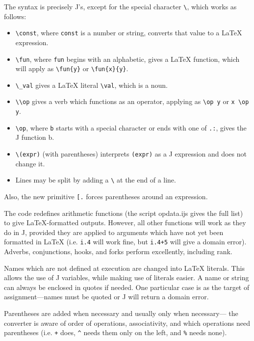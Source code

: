 \documentclass{article}
\begin{document}
The syntax is precisely J's, except for the special character
\lstinline`\`, which works as follows:
\begin{itemize}
  \item \lstinline`\const`, where \lstinline`const` is a number or string,
    converts that value to a LaTeX expression.
  \item \lstinline`\fun`, where \lstinline`fun` begins with an alphabetic,
    gives a LaTeX function, which will apply as \lstinline`\fun{y}`
    or \lstinline`\fun{x}{y}`.
  \item \lstinline`\_val` gives a LaTeX literal \lstinline`\val`, which is a noun.
  \item \lstinline`\\op` gives a verb which functions as an operator,
    applying as \lstinline`\op y` or \lstinline`x \op y`.
  \item \lstinline`\op`, where \lstinline`b` starts with a special character or
    ends with one of \lstinline`.:`, gives the J function b.
  \item \lstinline`\(expr)` (with parentheses) interprets \lstinline`(expr)`
    as a J expression and does not change it.
  \item Lines may be split by adding a \lstinline`\` at the end of a line.
\end{itemize}

Also, the new primitive \lstinline`[.` forces parentheses around an expression.

The code redefines arithmetic functions (the script opdata.ijs gives the
full list) to give LaTeX-formatted outputs.
However, all other functions will work as they do in J, provided they are
applied to arguments which have not yet been formatted in LaTeX
(i.e. \lstinline`i.4` will work fine, but \lstinline`i.4+5` will give a domain
error).
Adverbs, conjunctions, hooks, and forks perform excellently, including
rank.

Names which are not defined at execution are changed into LaTeX literals.
This allows the use of J variables, while making use of literals easier. 
A name or string can always be enclosed in quotes if needed.
One particular case is as the target of assignment---names must be quoted
or J will return a domain error.

Parentheses are added when necessary and usually only when necessary---
the converter is aware of order of operations, associativity, and which
operations need parentheses (i.e. \lstinline`+` does, \lstinline`^` needs them
only on the left, and \lstinline`%` needs none).
\end{document}
